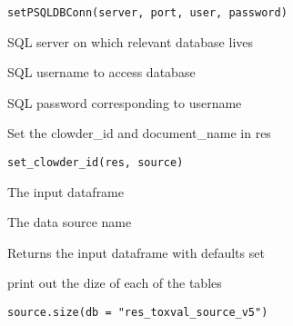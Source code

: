 \documentclass[letterpaper]{book}
\begin{document}
%
\begin{Usage}
\begin{verbatim}
setPSQLDBConn(server, port, user, password)
\end{verbatim}
\end{Usage}
%
\begin{Arguments}
\begin{ldescription}
\item[\code{server}] SQL server on which relevant database lives

\item[\code{user}] SQL username to access database

\item[\code{password}] SQL password corresponding to username
\end{ldescription}
\end{Arguments}
%
\begin{Description}\relax
Set the clowder\_id and document\_name in res
\end{Description}
%
\begin{Usage}
\begin{verbatim}
set_clowder_id(res, source)
\end{verbatim}
\end{Usage}
%
\begin{Arguments}
\begin{ldescription}
\item[\code{res}] The input dataframe

\item[\code{source}] The data source name
\end{ldescription}
\end{Arguments}
%
\begin{Value}
Returns the input dataframe with defaults set
\end{Value}
%
\begin{Description}\relax
print out the dize of each of the tables
\end{Description}
%
\begin{Usage}
\begin{verbatim}
source.size(db = "res_toxval_source_v5")
\end{verbatim}
\end{Usage}
%
\end{document}
